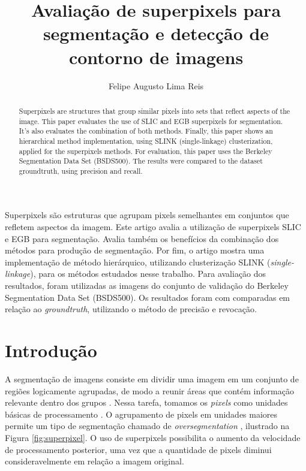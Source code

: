 \title{Avaliação de superpixels para segmentação e detecção de contorno de imagens}
\author{Felipe Augusto Lima Reis\inst{1}}
\begin{document}
 

\maketitle

\begin{abstract}
  Superpixels are structures that group similar pixels into sets that reflect aspects of the image. This paper evaluates the use of SLIC and EGB superpixels for segmentation. It's also evaluates the combination of both methods. Finally, this paper shows an hierarchical method implementation, using SLINK (single-linkage) clusterization, applied for the superpixels methods. For evaluation, this paper uses the Berkeley Segmentation Data Set (BSDS500). The results were compared to the dataset groundtruth, using precision and recall.
\end{abstract}
     
\begin{resumo} 
  Superpixels são estruturas que agrupam pixels semelhantes em conjuntos que refletem aspectos da imagem. Este artigo avalia a utilização de superpixels SLIC e EGB para segmentação. Avalia também os benefícios da combinação dos métodos para produção de segmentação. Por fim, o artigo mostra uma implementação de método hierárquico, utilizando clusterização SLINK (\textit{single-linkage}), para os métodos estudados nesse trabalho. Para avaliação dos resultados, foram utilizadas as imagens do conjunto de validação do Berkeley Segmentation Data Set (BSDS500). Os resultados foram com comparadas em relação ao \textit{groundtruth}, utilizando o método de precisão e revocação.
\end{resumo}


\section{Introdução} \label{sec:introducao}

A segmentação de imagens consiste em dividir uma imagem em um conjunto de regiões logicamente agrupadas, de modo a reunir áreas que contém informação relevante dentro dos grupos \cite{DOMINGUEZ}. Nessa tarefa, tomamos os \textit{pixels} como unidades básicas de processamento \cite{WANG201728}. O agrupamento de pixels em unidades maiores permite um tipo de segmentação chamado de \textit{oversegmentation} \cite{WANG201728}, ilustrado na Figura \ref{fig:superpixel}. O uso de superpixels possibilita o aumento da velocidade de processamento posterior, uma vez que a quantidade de pixels diminui consideravelmente em relação a imagem original.
\end{document}
